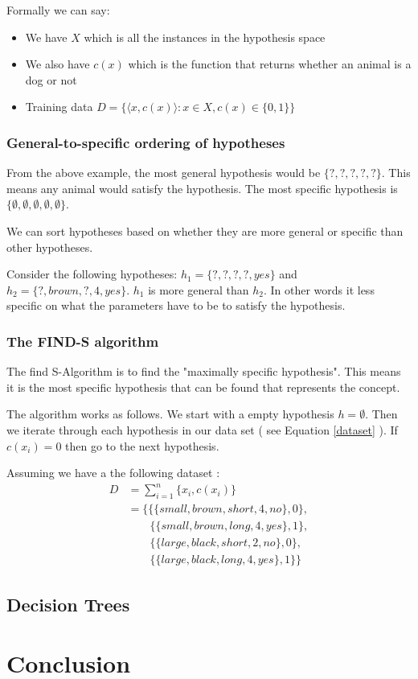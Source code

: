 \documentclass[10pt,a4paper]{article}
\begin{document}
Formally we can say:

\begin{itemize}
\item We have $X$ which is all the instances in the hypothesis space
\item We also have $c(x)$ which is the function that returns whether an animal is a dog or not
\item Training data $ D = \{ \langle x,c(x) \rangle : x \in X, c(x) \in \{0,1\}\}$
\end{itemize}

\citep{stan}

\subsubsection{General-to-specific ordering of hypotheses}

From the above example, the most general hypothesis would be $\{?,?,?,?,?\}$. This means any animal would satisfy the hypothesis. The most specific hypothesis is $\{\emptyset,\emptyset,\emptyset,\emptyset,\emptyset\}$. 

We can sort hypotheses based on whether they are more general or specific than other hypotheses.

Consider the following hypotheses: $h_1 = \{?,?,?,?,yes\}$ and $h_2 = \{?,brown,?,4,yes\}$. $h_1$ is more general than $h_2$. In other words it less specific on what the parameters have to be to satisfy the hypothesis. 

\citep{Riedmiller}
\subsubsection{The FIND-S algorithm }
The find S-Algorithm is to find the "maximally specific hypothesis". This means it is the most specific hypothesis that can be found that represents the concept.

The algorithm works as follows. We start with a empty hypothesis $h = \emptyset$. Then we iterate through each hypothesis in our data set ( see Equation \ref{dataset} ). If $c(x_i) = 0 $ then go to the next hypothesis.  


Assuming we have a the following dataset : 
\begin{equation}
\label{dataset}
\begin{split}
D &= \sum_{i=1}^n\{x_i,c(x_i)\}\\ 
  &= \{        \{\{ small, brown, short, 4, no\}, 0\},\\
  & \quad\quad \{\{ small, brown, long, 4, yes\}, 1\},\\
  & \quad\quad \{\{ large, black, short, 2, no\}, 0\},\\
  & \quad\quad \{\{ large, black, long, 4, yes\}, 1\}
     \}
\end{split}
\end{equation} 



\citep{stan}

\citep{Cardie}

\subsection{Decision Trees}

\section{Conclusion}


\end{document}
